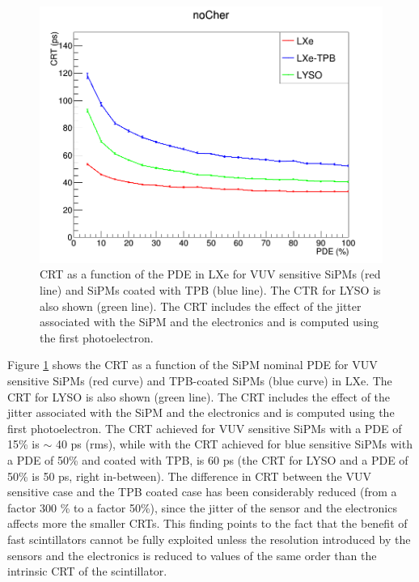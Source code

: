\documentclass[review]{elsarticle}
\begin{document}
 \begin{figure}[!bhtp]
	\centering
	\includegraphics[scale=0.5]{../img/CTR_jitter_fixed_n.png}
	\caption{\label{fig.crt3} CRT as a function of the PDE in LXe for VUV sensitive SiPMs (red line) and SiPMs coated with TPB (blue line). The CTR for LYSO is also shown (green line). The CRT includes the
	effect of the jitter associated with the SiPM and the electronics and is computed using the first photoelectron.}
\end{figure}

Figure \ref{fig.crt3} shows the CRT as a function of the
 SiPM nominal PDE for VUV sensitive SiPMs (red curve) and TPB-coated SiPMs (blue curve) in LXe. The CRT for LYSO is also shown (green line). The CRT includes the
effect of the jitter associated with the SiPM and the electronics and is computed using the first photoelectron.
The CRT achieved for VUV sensitive SiPMs with a PDE of 15\% is $\sim$ 40 ps (rms), while with the CRT achieved for blue sensitive SiPMs with a PDE of 50\% and coated with TPB, is 60 ps (the CRT for LYSO and a PDE of 50\% is 50 ps, right in-between). The difference in CRT between the VUV sensitive case and the TPB coated case has been considerably reduced (from a factor 300 \% to a factor 50\%), since the jitter of the sensor and the electronics affects more the smaller CRTs. This finding points to the fact that the benefit of fast scintillators cannot be fully exploited unless the resolution introduced by the sensors and the electronics is reduced to values of the same order than the intrinsic CRT of the scintillator. 
\end{document}
